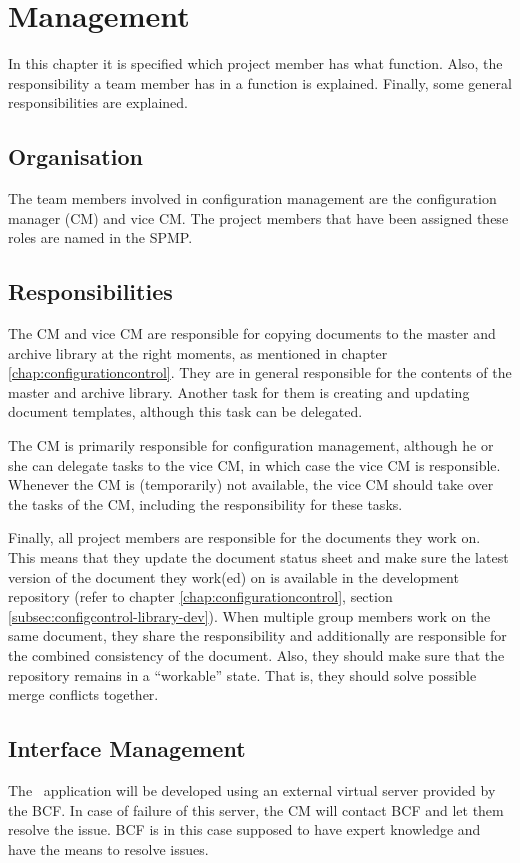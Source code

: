 \chapter{Management}
\label{chap:management}
In this chapter it is specified which project member has what function. Also, the responsibility a team member has in a function is explained. Finally, some general responsibilities are explained.

\section{Organisation}
The team members involved in configuration management are the configuration manager (CM) and vice CM. The project members that have been assigned these roles are named in the SPMP.

\section{Responsibilities}
The CM and vice CM are responsible for copying documents to the master and archive library at the right moments, as mentioned in chapter \ref{chap:configurationcontrol}. They are in general responsible for the contents of the master and archive library. Another task for them is creating and updating document templates, although this task can be delegated.

The CM is primarily responsible for configuration management, although he or she can delegate tasks to the vice CM, in which case the vice CM is responsible. Whenever the CM is (temporarily) not available, the vice CM should take over the tasks of the CM, including the responsibility for these tasks.

Finally, all project members are responsible for the documents they work on. This means that they update the document status sheet and make sure the latest version of the document they work(ed) on is available in the development repository (refer to chapter \ref{chap:configurationcontrol}, section \ref{subsec:configcontrol-library-dev}). When multiple group members work on the same document, they share the responsibility and additionally are responsible for the combined consistency of the document. Also, they should make sure that the repository remains in a ``workable'' state. That is, they should solve possible merge conflicts together.

\section{Interface Management}
\label{sec:interfacemanagement}
The \projectname\ application will be developed using an external virtual server provided by the BCF. In case of failure of this server, the CM will contact BCF and let them resolve the issue. BCF is in this case supposed to have expert knowledge and have the means to resolve issues.

